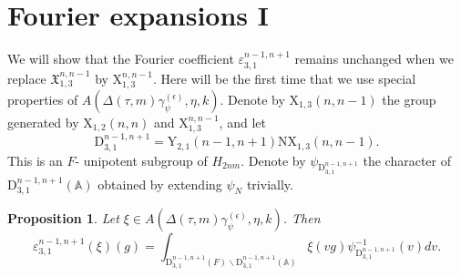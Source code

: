 \documentclass[12pts]{amsart}
\newcommand{\BA}{{\mathbb {A}}}
\newtheorem{prop}[thm]{Proposition}
\begin{document}
\section{Fourier expansions I}

We will show that the Fourier coefficient
$\varepsilon_{3,1}^{n-1,n+1}$ remains unchanged when we replace
$\mathfrak{X}_{1,3}^{n,n-1}$ by $\mathrm{X}_{1,3}^{n,n-1}$. Here
will be the first time that we use special properties of
$A(\Delta(\tau,m)\gamma_\psi^{(\epsilon)},\eta,k)$. Denote by $\mathrm{X}_{1,3}(n,n-1)$ the group
generated by $\mathrm{X}_{1,2}(n,n)$ and $\mathrm{X}_{1,3}^{n,n-1}$,
and let
\begin{equation}\label{8.1}
\mathrm{D}_{3,1}^{n-1,n+1}=\mathrm{Y}_{2,1}(n-1,n+1)\mathrm{N}\mathrm{X}_{1,3}(n,n-1).
\end{equation}
This is an $F$- unipotent subgroup of $H_{2nm}$. Denote by
$\psi_{\mathrm{D}_{3,1}^{n-1,n+1}}$ the character of
$\mathrm{D}_{3,1}^{n-1,n+1}(\BA)$ obtained by extending $\psi_N$
trivially.
\begin{prop}\label{prop 8.1}
	Let $\xi\in A(\Delta(\tau,m)\gamma_\psi^{(\epsilon)},\eta,k)$. Then
	\begin{equation}\label{8.1'}
	\varepsilon_{3,1}^{n-1,n+1}(\xi)(g)=\int_{\mathrm{D}_{3,1}^{n-1,n+1}(F)\backslash
		\mathrm{D}_{3,1}^{n-1,n+1}(\BA)}\xi(vg)\psi_{\mathrm{D}_{3,1}^{n-1,n+1}}^{-1}(v)dv.
	\end{equation}
		\end{prop}
\end{document}
